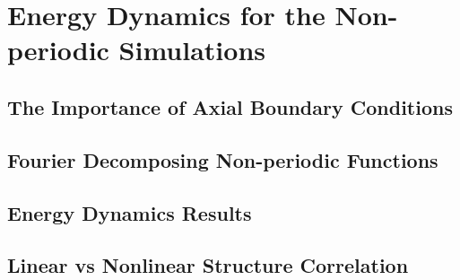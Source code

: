 \chapter{Energy Dynamics for the Non-periodic Simulations}
\label{c_nlin_nonper}

\section{The Importance of Axial Boundary Conditions}
\label{s_axial_bndry}

\section{Fourier Decomposing Non-periodic Functions}
\label{s_fourier_decomp}

\section{Energy Dynamics Results}
\label{s_nonper_en_dyn}

\section{Linear vs Nonlinear Structure Correlation}
\label{s_lin_vs_nlin_struc}
